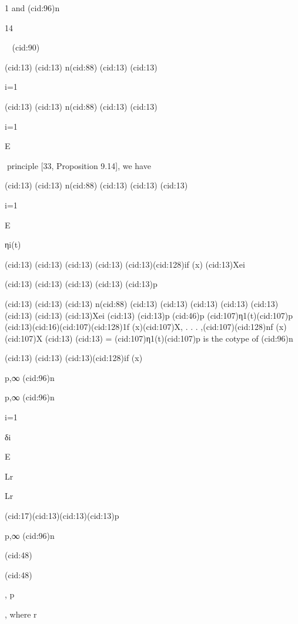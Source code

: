 {1 and (cid:96)n

14


(cid:90)





(cid:13)
(cid:13) n(cid:88)
(cid:13)
(cid:13)

i=1

(cid:13)
(cid:13) n(cid:88)
(cid:13)
(cid:13)

i=1

E

principle [33, Proposition 9.14], we have

(cid:13)
(cid:13) n(cid:88)
(cid:13)
(cid:13)
(cid:13)

i=1

E

ηi(t)

(cid:13)
(cid:13)
(cid:13)
(cid:13)
(cid:13)(cid:128)if (x)
(cid:13)Xei

(cid:13)
(cid:13)
(cid:13)
(cid:13)
(cid:13)p

(cid:13)
(cid:13)
(cid:13) n(cid:88)
(cid:13)
(cid:13)
(cid:13)
(cid:13)
(cid:13)
(cid:13)
(cid:13)
(cid:13)Xei
(cid:13)
(cid:13)p
(cid:46)p (cid:107)η1(t)(cid:107)p
(cid:13)(cid:16)(cid:107)(cid:128)1f (x)(cid:107)X, . . . ,(cid:107)(cid:128)nf (x)(cid:107)X
(cid:13)
(cid:13)
= (cid:107)η1(t)(cid:107)p
is the cotype of (cid:96)n

(cid:13)
(cid:13)
(cid:13)(cid:128)if (x)

p,∞
(cid:96)n

p,∞
(cid:96)n

i=1

δi

E

Lr

Lr

(cid:17)(cid:13)(cid:13)(cid:13)p

p,∞
(cid:96)n

(cid:48)

(cid:48)

, p}, where r

